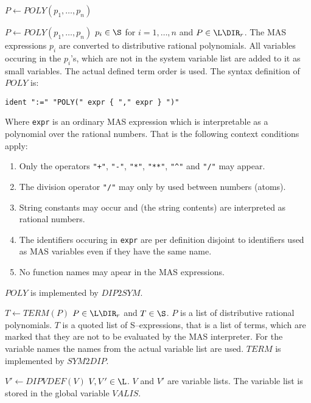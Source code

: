 \begin{deflist}{$P \gets POLY(p_1, \ldots, p_n)$} 
\item[$P \gets POLY(p_1, \ldots, p_n)$] 
      $p_i \in \S$ for $i=1, \ldots, n$ and $P \in \L\DIR_r$. 
      The MAS expressions $p_i$ are converted to 
      distributive rational polynomials. All variables 
      occuring in the $p_i$'s, which are not in the 
      system variable list are added to it as small variables. 
      The actual defined term order is used. 
      The syntax definition of $POLY$ is:
      \begin{verbatim}
ident ":=" "POLY(" expr { "," expr } ")"
      \end{verbatim}
      Where \verb/expr/ is an ordinary 
      MAS expression which is interpretable as a polynomial 
      over the rational numbers. 
      That is the following context conditions apply:
      \begin{enumerate}
      \item Only the operators \verb/"+"/, \verb/"-"/, 
            \verb/"*"/, \verb/"**"/, \verb/"^"/ and \verb."/". 
            may appear.  
      \item The division operator \verb."/". may 
            only by used between numbers (atoms).
      \item String constants may occur and 
            (the string contents) are interpreted as 
            rational numbers.  
      \item The identifiers occuring in \verb/expr/ 
            are per definition disjoint to identifiers 
            used as MAS variables even if they have the 
            same name.
      \item No function names may apear in the MAS expressions.
      \end{enumerate}
      $POLY$ is implemented by $DIP2SYM$.
\item[$T \gets TERM(P)$] 
      $P \in \L\DIR_r$ and $T \in \S$. 
      $P$ is a list of distributive rational polynomials. 
      $T$ is a quoted list of S--expressions, that is
      a list of terms, which are marked that they are 
      not to be evaluated by the MAS interpreter.
      For the variable names the names from the 
      actual variable list are used. 
      $TERM$ is implemented by $SYM2DIP$.
\item[$V' \gets DIPVDEF(V)$] $V, V' \in \L$. 
      $V$ and $V'$ are variable lists. 
      The variable list is stored in the 
      global variable $VALIS$. 

\end{deflist}
